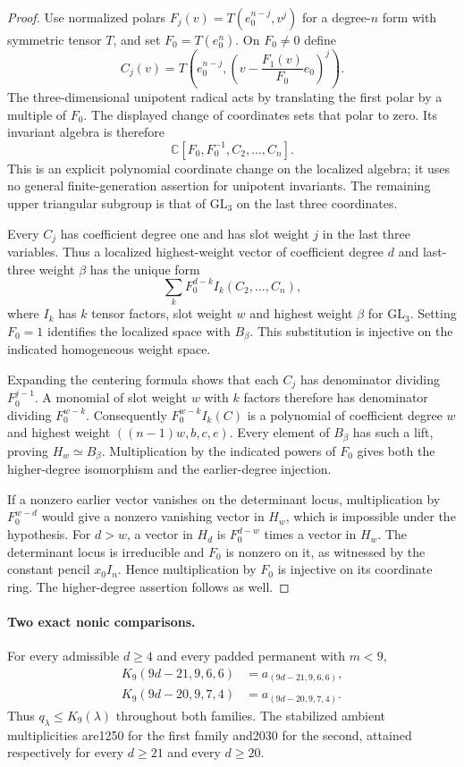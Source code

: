 \begin{proof}
Use normalized polars
$F_j(v)=T(e_0^{n-j},v^j)$ for a degree-$n$ form with symmetric tensor
$T$, and set $F_0=T(e_0^n)$. On $F_0\ne0$ define
\[
 C_j(v)=T\left(e_0^{n-j},
               \left(v-\frac{F_1(v)}{F_0}e_0\right)^j\right).
\]
The three-dimensional unipotent radical acts by translating the first
polar by a multiple of $F_0$. The displayed change of coordinates
sets that polar to zero. Its invariant algebra is therefore
\[
 \mathbb C[F_0,F_0^{-1},C_2,\ldots,C_n].
\]
This is an explicit polynomial coordinate change on the localized
algebra; it uses no general finite-generation assertion for unipotent
invariants. The remaining upper triangular subgroup is that of
$\mathrm{GL}_3$ on the last three coordinates.

Every $C_j$ has coefficient degree one and has slot weight $j$ in the
last three variables. Thus a localized highest-weight vector of
coefficient degree $d$ and last-three weight $\beta$ has the unique form
\[
              \sum_k F_0^{d-k}I_k(C_2,\ldots,C_n),
\]
where $I_k$ has $k$ tensor factors, slot weight $w$ and highest weight
$\beta$ for $\mathrm{GL}_3$. Setting $F_0=1$ identifies the localized
space with $B_\beta$. This substitution is injective on the indicated
homogeneous weight space.

Expanding the centering formula shows that each $C_j$ has denominator
dividing $F_0^{j-1}$. A monomial of slot weight $w$ with $k$ factors
therefore has denominator dividing $F_0^{w-k}$. Consequently
$F_0^{w-k}I_k(C)$ is a polynomial of coefficient degree $w$ and
highest weight $((n-1)w,b,c,e)$. Every element of $B_\beta$ has such
a lift, proving $H_w\simeq B_\beta$. Multiplication by the indicated
powers of $F_0$ gives both the higher-degree isomorphism and the
earlier-degree injection.

If a nonzero earlier vector vanishes on the determinant locus,
multiplication by $F_0^{w-d}$ would give a nonzero vanishing vector
in $H_w$, which is impossible under the hypothesis. For $d>w$, a
vector in $H_d$ is $F_0^{d-w}$ times a vector in $H_w$. The determinant
locus is irreducible and $F_0$ is nonzero on it, as witnessed by the
constant pencil $x_0I_n$. Hence multiplication by $F_0$ is injective
on its coordinate ring. The higher-degree assertion follows as well.
\end{proof}

\paragraph{Two exact nonic comparisons.}
For every admissible $d\ge4$ and every padded permanent with $m<9$,
\[
\begin{split}
 K_9(9d-21,9,6,6)&=a_{(9d-21,9,6,6)},\\
 K_9(9d-20,9,7,4)&=a_{(9d-20,9,7,4)}.
\end{split}
\]
Thus $q_\lambda\le K_9(\lambda)$ throughout both families.
The stabilized ambient multiplicities are1250 for the first family
and2030 for the second, attained respectively for every $d\ge21$
and every $d\ge20$.

